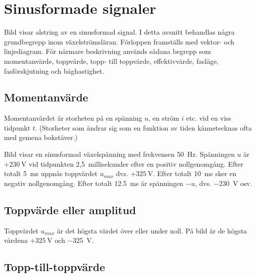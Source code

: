 \newpage
\section{Sinusformade signaler}


Bild  visar alstring av en sinusformad signal.
I detta avsnitt behandlas några grundbegrepp inom växelströmsläran.
Förloppen framställs med vektor- och linjediagram.
För närmare beskrivning används sådana begrepp som momentanvärde,
toppvärde, topp- till toppvärde, effektivvärde, fasläge, fasförskjutning och
båghastighet.

\subsection{Momentanvärde}

Momentanvärdet är storheten på en spänning \(u\), en ström \(i\) etc. vid en
viss tidpunkt \(t\).
(Storheter som ändrar sig som en funktion av tiden kännetecknas ofta med gemena
bokstäver.)

Bild  visar en sinusformad växelspänning med frekvensen
\SI{50}{\hertz}.
Spänningen \(u\) är \(+230\ \text{V}\) vid tidpunkten 2,5~millisekunder efter en
positiv nollgenomgång.
Efter totalt \SI{5}{\milli\second} uppnås toppvärdet \(u_{max}\) dvs. \(+325\ \text{V}\).
Efter totalt \SI{10}{\milli\second} sker en negativ nollgenomgång.
Efter totalt \SI{12,5}{\milli\second} är spänningen \(-u\), dvs. \SI{-230}{\volt} osv.

\subsection{Toppvärde eller amplitud}
\label{toppvärde}

Toppvärdet \(u_{max}\) är det högsta värdet över eller under noll.
På bild  är de högsta värdena \(+325\ \text{V}\) och
\SI{-325}{\volt}.

\subsection{Topp-till-toppvärde}
\label{peak-to-peak-värde}

